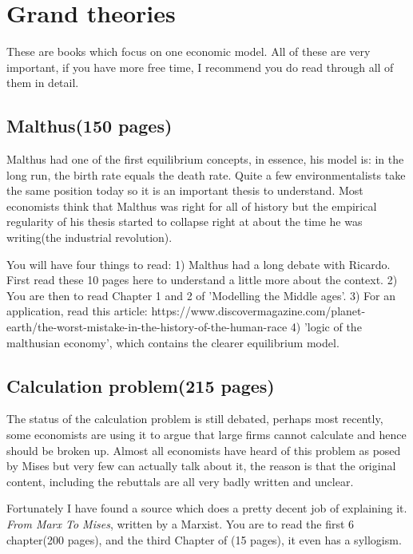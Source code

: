 \documentclass[12pt]{report}
\numberwithin{equation}{section}
\begin{document}
\section*{Grand theories}

These are books which focus on one economic model. All of these are very important, if you have more free time, I recommend you do read through all of them in detail.

\subsection*{Malthus(150 pages)}
Malthus had one of the first equilibrium concepts, in essence, his model is: in the long run, the birth rate equals the death rate. Quite a few environmentalists take the same position today so it is an important thesis to understand. Most economists think that Malthus was right for all of history but the empirical regularity of his thesis started to collapse right at about the time he was writing(the industrial revolution). 

You will have four things to read:
1) Malthus had a long debate with Ricardo. First read these 10 pages here to understand a little more about the context. 
2) You are then to read Chapter 1 and 2 of 'Modelling the Middle ages'.  
3) For an application, read this article: https://www.discovermagazine.com/planet-earth/the-worst-mistake-in-the-history-of-the-human-race
4) 'logic of the malthusian economy', which contains the clearer equilibrium model. 

\newpage

\subsection*{Calculation problem(215 pages)}

The status of the calculation problem is still debated, perhaps most recently, some economists are using it to argue that large firms cannot calculate and hence should be broken up. Almost all economists have heard of this problem as posed by Mises but very few can actually talk about it, the reason is that the original content, including the rebuttals are all very badly written and unclear. 

Fortunately I have found a source which does a pretty decent job of explaining it. \textit{From Marx To Mises}, written by a Marxist. You are to read the first 6 chapter(200 pages), and the third Chapter of (15 pages), it even has a syllogism. 
\end{document}
